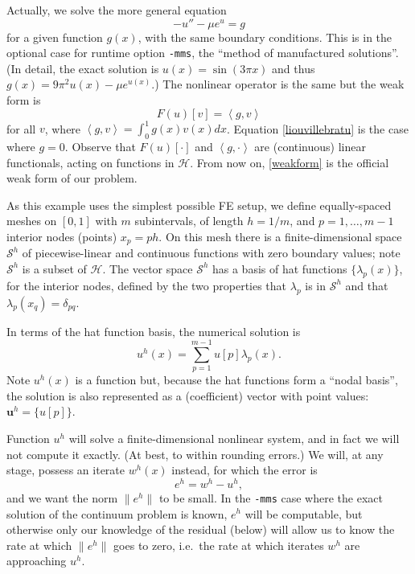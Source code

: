 \documentclass[letterpaper,final,12pt,reqno]{amsart}
\newcommand{\bu}{\mathbf{u}}
\newcommand{\ip}[2]{\left<#1,#2\right>}
\begin{document}
Actually, we solve the more general equation
  $$-u'' - \mu e^u = g$$
for a given function $g(x)$, with the same boundary conditions.  This is in the optional case for runtime option \texttt{-mms}, the ``method of manufactured solutions''.  (In detail, the exact solution is $u(x)=\sin(3\pi x)$ and thus $g(x)=9\pi^2 u(x)-\mu e^{u(x)}$.)  The nonlinear operator is the same but the weak form is
\begin{equation}
  F(u)[v] = \ip{g}{v} \label{weakform}
\end{equation}
for all $v$, where $\ip{g}{v} = \int_0^1 g(x) v(x) dx$.  Equation \eqref{liouvillebratu} is the case where $g=0$.  Observe that $F(u)[\cdot]$ and $\ip{g}{\cdot}$ are (continuous) linear functionals, acting on functions in $\mathcal{H}$.  From now on, \eqref{weakform} is the official weak form of our problem.

As this example uses the simplest possible FE setup, we define equally-spaced meshes on $[0,1]$ with $m$ subintervals, of length $h=1/m$, and $p=1,\dots,m-1$ interior nodes (points) $x_p=ph$.  On this mesh there is a finite-dimensional space $\mathcal{S}^h$ of piecewise-linear and continuous functions with zero boundary values; note $\mathcal{S}^h$ is a subset of $\mathcal{H}$.  The vector space $\mathcal{S}^h$ has a basis of hat functions $\{\lambda_p(x)\}$, for the interior nodes, defined by the two properties that $\lambda_p$ is in $\mathcal{S}^h$ and that $\lambda_p(x_q)=\delta_{pq}$.

In terms of the hat function basis, the numerical solution is
\begin{equation}
  u^h(x) = \sum_{p=1}^{m-1} u[p] \lambda_p(x).  \label{fesolution}
\end{equation}
Note $u^h(x)$ is a function but, because the hat functions form a ``nodal basis'', the solution is also represented as a (coefficient) vector with point values: $\bu^h =\{u[p]\}$.

Function $u^h$ will solve a finite-dimensional nonlinear system, and in fact we will not compute it exactly.  (At best, to within rounding errors.)  We will, at any stage, possess an iterate $w^h(x)$ instead, for which the error is
\begin{equation}
  e^h = w^h - u^h,  \label{feerror}
\end{equation}
and we want the norm $\|e^h\|$ to be small.  In the \texttt{-mms} case where the exact solution of the continuum problem is known, $e^h$ will be computable, but otherwise only our knowledge of the residual (below) will allow us to know the rate at which $\|e^h\|$ goes to zero, i.e.~the rate at which iterates $w^h$ are approaching $u^h$.
\end{document}
